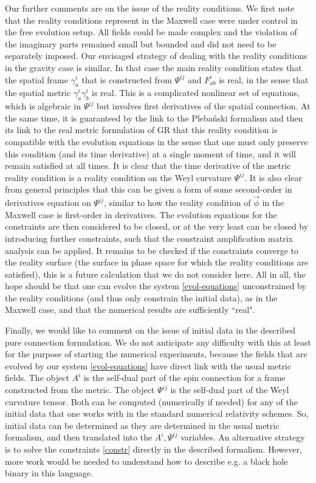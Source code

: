 \documentclass[10pt]{report}
\newcommand{\pleb}[0]{Pleba\'nski}
\theoremstyle{definition}
\begin{document}
Our further comments are on the issue of the reality conditions. We first note that the reality conditions represent in the Maxwell case were under control in the free evolution setup. All fields could be made complex and the violation of the imaginary parts remained small but bounded and did not need to be separately imposed. Our envisaged strategy of dealing with the reality conditions in the gravity case is similar. In that case the main reality condition states that the spatial frame $\gamma^i_a$ that is constructed from $\Psi^{ij}$ and $F^i_{ab}$ is real, in the sense that the spatial metric $\gamma^i_a \gamma^i_b$ is real. This is a complicated nonlinear set of equations, which is algebraic in $\Psi^{ij}$ but involves first derivatives of the spatial connection. At the same time, it is guaranteed by the link to the \pleb{} formalism and then its link to the real metric formulation of GR that this reality condition is compatible with the evolution equations in the sense that one must only preserve this condition (and its time derivative) at a single moment of time, and it will remain satisfied at all times. It is clear that the time derivative of the metric reality condition is a reality condition on the Weyl curvature $\Psi^{ij}$. It is also clear from general principles that this can be given a form of some second-order in derivatives equation on $\Psi^{ij}$, similar to how the reality condition of $\vec{\phi}$ in the Maxwell case is first-order in derivatives. The evolution equations for the constraints are then considered to be closed, or at the very least can be closed by introducing further constraints, such that the constraint amplification matrix analysis can be applied. It remains to be checked if the constraints converge to the reality surface (the surface in phase space for which the reality conditions are satisfied), this is a future calculation that we do not consider here. All in all, the hope should be that one can evolve the system \cref{evol-equations} unconstrained by the reality conditions (and thus only constrain the initial data), as in the Maxwell case, and that the numerical results are sufficiently ``real".

Finally, we would like to comment on the issue of initial data in the described pure connection formulation. We do not anticipate any difficulty with this at least for the purpose of starting the numerical experiments, because the fields that are evolved by our system \cref{evol-equations} have direct link with the usual metric fields. The object $A^i$ is the self-dual part of the spin connection for a frame constructed from the metric. The object $\Psi^{ij}$ is the self-dual part of the Weyl curvature tensor. Both can be computed (numerically if needed) for any of the initial data that one works with in the standard numerical relativity schemes. So, initial data can be determined as they are determined in the usual metric formalism, and then translated into the $A^i, \Psi^{ij}$ variables. An alternative strategy is to solve the constraints \cref{constr} directly in the described formalism. However, more work would be needed to understand how to describe e.g. a black hole binary in this language.
\end{document}

